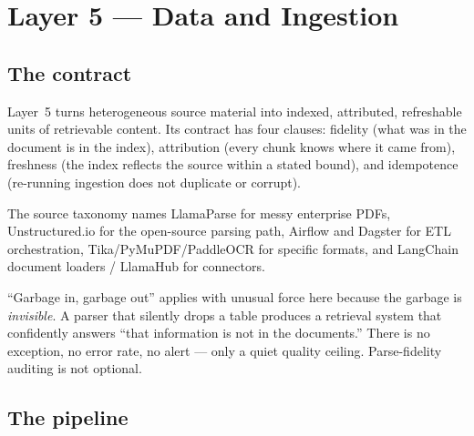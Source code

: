 \documentclass[11pt,twoside,openright]{book}
\theoremstyle{definition}
\theoremstyle{plain}
\theoremstyle{remark}
\begin{document}
\cleardoublepage

\chapter{Layer 5 --- Data and Ingestion}
\label{ch:data}

\section{The contract}

Layer~5 turns heterogeneous source material into indexed, attributed,
refreshable units of retrievable content. Its contract has four clauses: fidelity
(what was in the document is in the index), attribution (every chunk knows where
it came from), freshness (the index reflects the source within a stated bound),
and idempotence (re-running ingestion does not duplicate or corrupt).

The source taxonomy names LlamaParse for messy enterprise PDFs, Unstructured.io
for the open-source parsing path, Airflow and Dagster for ETL orchestration,
Tika/PyMuPDF/PaddleOCR for specific formats, and LangChain document
loaders / LlamaHub for connectors.

\begin{keyidea}
``Garbage in, garbage out'' applies with unusual force here because the garbage
is \emph{invisible}. A parser that silently drops a table produces a retrieval
system that confidently answers ``that information is not in the documents.''
There is no exception, no error rate, no alert --- only a quiet quality ceiling.
Parse-fidelity auditing is not optional.
\end{keyidea}

\section{The pipeline}
\end{document}
